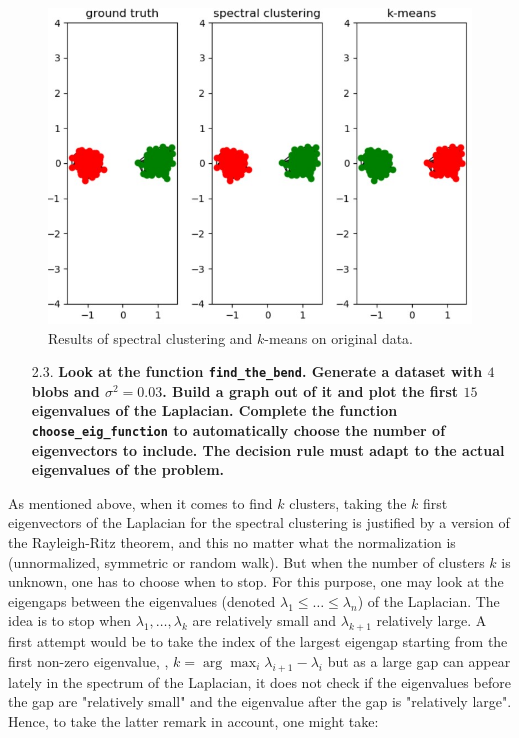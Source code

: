 \documentclass[a4paper, 11pt]{article}
\begin{document}
    \begin{figure}[!ht]
        \centering
        \includegraphics[width=.5\textwidth]{images/question_22_results.jpg}
        \caption{Results of spectral clustering and $k$-means on original data.}
        \label{fig:question-22-results}
    \end{figure}

    \pagebreak

\begin{itemize}
    \item[2.3.] \textbf{Look at the function \texttt{find\_the\_bend}. Generate a dataset with $4$ blobs and $\sigma^{2} = 0.03$. Build a graph out of it and plot the first $15$ eigenvalues of the Laplacian. Complete the function \texttt{choose\_eig\_function} to automatically choose the number of eigenvectors to include. The decision rule must adapt to the actual eigenvalues of the problem.}
\end{itemize}

    As mentioned above, when it comes to find $k$ clusters, taking the $k$ first eigenvectors of the Laplacian for the spectral clustering is justified by a version of the Rayleigh-Ritz theorem, and this no matter what the normalization is (unnormalized, symmetric or random walk). But when the number of clusters $k$ is unknown, one has to choose when to stop. For this purpose, one may look at the eigengaps between the eigenvalues (denoted $\lambda_{1} \leq \dots \leq \lambda_{n}$) of the Laplacian. The idea is to stop when $\lambda_{1}, \dots, \lambda_{k}$ are relatively small and $\lambda_{k+1}$ relatively large. A first attempt would be to take the index of the largest eigengap starting from the first non-zero eigenvalue, \ie, $k = \arg \max_{i} \lambda_{i+1} - \lambda_{i}$ but as a large gap can appear lately in the spectrum of the Laplacian, it does not check if the eigenvalues before the gap are "relatively small" and the eigenvalue after the gap is "relatively large". Hence, to take the latter remark in account, one might take:
    
\end{document}
